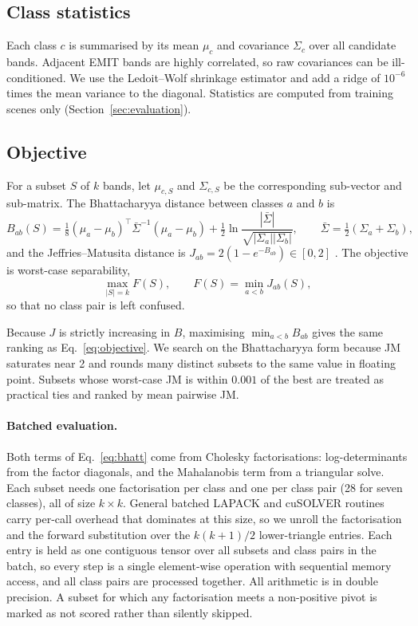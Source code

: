 \documentclass[11pt]{article}
\begin{document}
\subsection{Class statistics}

Each class $c$ is summarised by its mean $\mu_c$ and covariance $\Sigma_c$ over
all candidate bands. Adjacent EMIT bands are highly correlated, so raw
covariances can be ill-conditioned. We use the Ledoit--Wolf shrinkage estimator
\citep{ledoit2004} and add a ridge of $10^{-6}$ times the mean variance to the
diagonal. Statistics are computed from training scenes only
(Section~\ref{sec:evaluation}).

\subsection{Objective}
\label{sec:objective}

For a subset $S$ of $k$ bands, let $\mu_{c,S}$ and $\Sigma_{c,S}$ be the
corresponding sub-vector and sub-matrix. The Bhattacharyya distance between
classes $a$ and $b$ is
\begin{equation}
  B_{ab}(S) = \tfrac{1}{8}(\mu_a-\mu_b)^\top \bar\Sigma^{-1}(\mu_a-\mu_b)
            + \tfrac{1}{2}\ln\frac{|\bar\Sigma|}{\sqrt{|\Sigma_a||\Sigma_b|}},
  \qquad \bar\Sigma = \tfrac12(\Sigma_a+\Sigma_b),
  \label{eq:bhatt}
\end{equation}
and the Jeffries--Matusita distance is $J_{ab} = 2(1-e^{-B_{ab}}) \in [0,2]$
\citep{richards2013}. The objective is worst-case separability,
\begin{equation}
  \max_{|S|=k} F(S), \qquad F(S) = \min_{a<b} J_{ab}(S),
  \label{eq:objective}
\end{equation}
so that no class pair is left confused.

Because $J$ is strictly increasing in $B$, maximising $\min_{a<b} B_{ab}$ gives
the same ranking as Eq.~\eqref{eq:objective}. We search on the Bhattacharyya
form because JM saturates near 2 and rounds many distinct subsets to the same
value in floating point. Subsets whose worst-case JM is within $0.001$ of the
best are treated as practical ties and ranked by mean pairwise JM.

\paragraph{Batched evaluation.} Both terms of Eq.~\eqref{eq:bhatt} come from
Cholesky factorisations: log-determinants from the factor diagonals, and the
Mahalanobis term from a triangular solve. Each subset needs one factorisation
per class and one per class pair (28 for seven classes), all of size
$k\times k$. General batched LAPACK and cuSOLVER routines carry per-call
overhead that dominates at this size, so we unroll the factorisation and the
forward substitution over the $k(k+1)/2$ lower-triangle entries. Each entry is
held as one contiguous tensor over all subsets and class pairs in the batch,
so every step is a single element-wise operation with sequential memory
access, and all class pairs are processed together. All arithmetic is in
double precision. A subset for which any factorisation meets a non-positive
pivot is marked as not scored rather than silently skipped.
\end{document}
